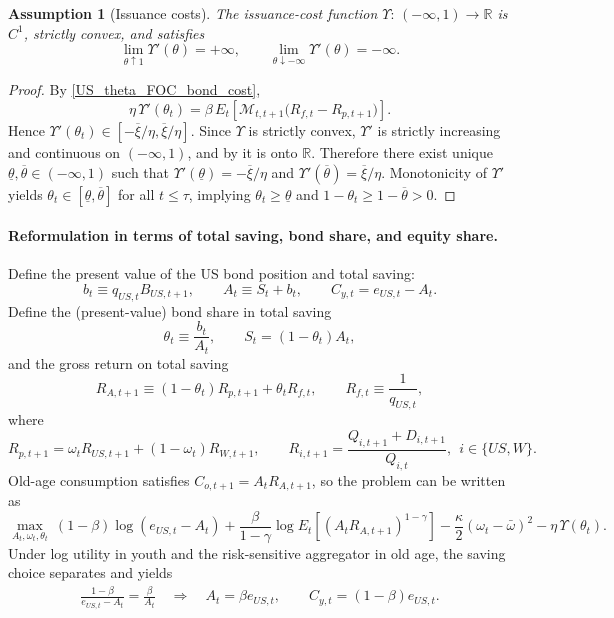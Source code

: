 \documentclass[12pt]{article}
\theoremstyle{plain}
\newtheorem{ass}{Assumption}
\begin{document}
\begin{ass}[Issuance costs]\label{ass_issuance_costs}
The issuance-cost function $\Upsilon:\,(-\infty,1)\to\mathbb R$ is $C^1$, strictly convex, and satisfies
\[
\lim_{\theta\uparrow 1}\Upsilon'(\theta)=+\infty,
\qquad
\lim_{\theta\downarrow -\infty}\Upsilon'(\theta)=-\infty.
\]
\end{ass}


\begin{proof}
By \eqref{US_theta_FOC_bond_cost},
\[
\eta\,\Upsilon'(\theta_t)
=\beta\,E_t\!\left[\mathcal M_{t,t+1}\bigl(R_{f,t}-R_{p,t+1}\bigr)\right].
\]
Hence $\Upsilon'(\theta_t)\in[-\overline\xi/\eta,\overline\xi/\eta]$. Since $\Upsilon$ is strictly convex,
$\Upsilon'$ is strictly increasing and continuous on $(-\infty,1)$, and by  it is onto $\mathbb R$.
Therefore there exist unique $\underline\theta,\overline\theta\in(-\infty,1)$ such that
$\Upsilon'(\underline\theta)=-\overline\xi/\eta$ and $\Upsilon'(\overline\theta)=\overline\xi/\eta$.
Monotonicity of $\Upsilon'$ yields $\theta_t\in[\underline\theta,\overline\theta]$ for all $t\le\tau$, implying
$\theta_t\ge \underline\theta$ and $1-\theta_t\ge 1-\overline\theta>0$.
\end{proof}

\paragraph{Reformulation in terms of total saving, bond share, and equity share.}
Define the present value of the US bond position and total saving:
\[
b_t\equiv q_{US,t}B_{US,t+1},
\qquad
A_t \equiv S_t+b_t,
\qquad
C_{y,t}=e_{US,t}-A_t.
\]
Define the (present-value) bond share in total saving
\[
\theta_t \equiv \frac{b_t}{A_t},
\qquad
S_t=(1-\theta_t)A_t,
\]
and the gross return on total saving
\[
R_{A,t+1}\equiv (1-\theta_t)R_{p,t+1}+\theta_t R_{f,t},
\qquad
R_{f,t}\equiv \frac{1}{q_{US,t}},
\]
where
\[
R_{p,t+1}=\omega_t R_{US,t+1}+(1-\omega_t)R_{W,t+1},
\qquad
R_{i,t+1}=\frac{Q_{i,t+1}+D_{i,t+1}}{Q_{i,t}},
\ \ i\in\{US,W\}.
\]
Old-age consumption satisfies $C_{o,t+1}=A_tR_{A,t+1}$, so the problem can be written as
\[
\max_{A_t,\omega_t,\theta_t}
\ (1-\beta)\log(e_{US,t}-A_t)
+\frac{\beta}{1-\gamma}\log E_t\!\left[(A_tR_{A,t+1})^{1-\gamma}\right]
-\frac{\kappa}{2}(\omega_t-\bar\omega)^2
-\eta\,\Upsilon(\theta_t).
\]
Under log utility in youth and the risk-sensitive aggregator in old age, the saving choice separates and yields
\begin{align}\label{US_saving_rule_bond_cost}
\frac{1-\beta}{e_{US,t}-A_t}=\frac{\beta}{A_t}
\quad\Rightarrow\quad
A_t=\beta e_{US,t},
\qquad
C_{y,t}=(1-\beta)e_{US,t}.
\end{align}
\end{document}
